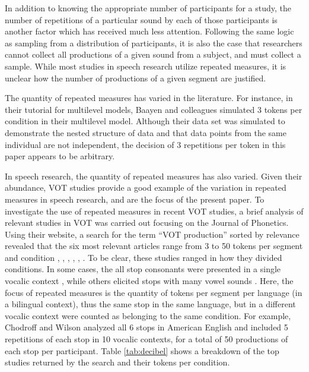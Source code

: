 \documentclass[
  a4paper,
  11pt,
  twocolumn]{article}
\begin{document}
In addition to knowing the appropriate number of participants for a
study, the number of repetitions of a particular sound by each of those
participants is another factor which has received much less attention.
Following the same logic as sampling from a distribution of
participants, it is also the case that researchers cannot collect all
productions of a given sound from a subject, and must collect a sample.
While most studies in speech research utilize repeated measures, it is
unclear how the number of productions of a given segment are justified.

The quantity of repeated measures has varied in the literature. For
instance, in their tutorial for multilevel models, Baayen and colleagues
\cite{baayen2008mixed} simulated 3 tokens per condition in their
multilevel model. Although their data set was simulated to demonstrate
the nested structure of data and that data points from the same
individual are not independent, the decision of 3 repetitions per token
in this paper appears to be arbitrary.

In speech research, the quantity of repeated measures has also varied.
Given their abundance, VOT studies provide a good example of the
variation in repeated measures in speech research, and are the focus of
the present paper. To investigate the use of repeated measures in recent
VOT studies, a brief analysis of relevant studies in VOT was carried out
focusing on the Journal of Phonetics. Using their website, a search for
the term ``VOT production'' sorted by relevance revealed that the six
most relevant articles range from 3 to 50 tokens per segment and
condition \cite{fish2017infant}, \cite{antoniou2011inter},
\cite{olson2013bilingual}, \cite{hussain2018typological},
\cite{gorba2022acquisition}, \cite{chodroff2017structure}. To be clear,
these studies ranged in how they divided conditions. In some cases, the
all stop consonants were presented in a single vocalic context
\cite{olson2013bilingual}, while others elicited stops with many vowel
sounds \cite{chodroff2017structure}. Here, the focus of repeated
measures is the quantity of tokens per segment per language (in a
bilingual context), thus the same stop in the same language, but in a
different vocalic context were counted as belonging to the same
condition. For example, Chodroff and Wilson \cite{chodroff2017structure}
analyzed all 6 stops in American English and included 5 repetitions of
each stop in 10 vocalic contexts, for a total of 50 productions of each
stop per participant. Table \ref{tab:decibel} shows a breakdown of the
top studies returned by the search and their tokens per condition.
\end{document}
